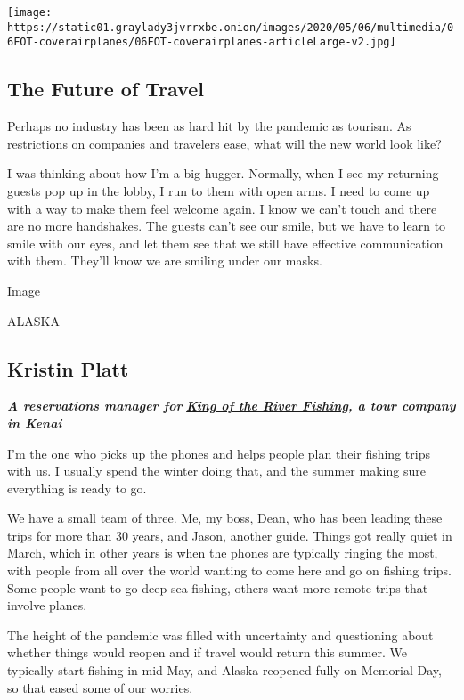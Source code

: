 \href{https://www.nytimes3xbfgragh.onion/interactive/2020/05/06/travel/coronavirus-travel-questions.html}{}

\texttt{[image: https://static01.graylady3jvrrxbe.onion/images/2020/05/06/multimedia/06FOT-coverairplanes/06FOT-coverairplanes-articleLarge-v2.jpg]}

\hypertarget{the-future-of-travel}{%
\subsection{The Future of Travel}\label{the-future-of-travel}}

Perhaps no industry has been as hard hit by the pandemic as tourism. As
restrictions on companies and travelers ease, what will the new world
look like?

I was thinking about how I'm a big hugger. Normally, when I see my
returning guests pop up in the lobby, I run to them with open arms. I
need to come up with a way to make them feel welcome again. I know we
can't touch and there are no more handshakes. The guests can't see our
smile, but we have to learn to smile with our eyes, and let them see
that we still have effective communication with them. They'll know we
are smiling under our masks.

Image

ALASKA

\hypertarget{kristin-platt}{%
\subsection{Kristin Platt}\label{kristin-platt}}

\emph{\textbf{A reservations manager for}}
\textbf{\href{https://www.kingoftheriver.com/}{\emph{King of the River
Fishing}}\emph{, a tour company in Kenai}}

I'm the one who picks up the phones and helps people plan their fishing
trips with us. I usually spend the winter doing that, and the summer
making sure everything is ready to go.

We have a small team of three. Me, my boss, Dean, who has been leading
these trips for more than 30 years, and Jason, another guide. Things got
really quiet in March, which in other years is when the phones are
typically ringing the most, with people from all over the world wanting
to come here and go on fishing trips. Some people want to go deep-sea
fishing, others want more remote trips that involve planes.

The height of the pandemic was filled with uncertainty and questioning
about whether things would reopen and if travel would return this
summer. We typically start fishing in mid-May, and Alaska reopened fully
on Memorial Day, so that eased some of our worries.

